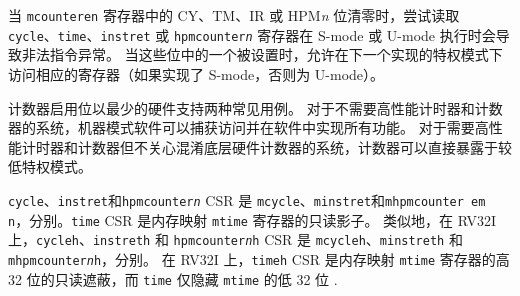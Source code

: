 当 {\tt mcounteren} 寄存器中的 CY、TM、IR 或 HPM{\em n} 位清零时，尝试读取 {\tt cycle}、{\tt time}、{\tt instret} 或 {\tt hpmcounter{\em n}} 寄存器在 S-mode 或 U-mode 执行时会导致非法指令异常。 当这些位中的一个被设置时，允许在下一个实现的特权模式下访问相应的寄存器（如果实现了 S-mode，否则为 U-mode）。

\iffalse
\begin{commentary}
The counter-enable bits support two common use cases with minimal hardware.
For systems that do not need high-performance timers and counters,
machine-mode software can trap accesses and implement all features in
software.  For systems that need high-performance timers and counters
but are not concerned with obfuscating the underlying hardware
counters, the counters can be directly exposed to lower privilege modes.
\end{commentary}
\fi

\begin{commentary}
计数器启用位以最少的硬件支持两种常见用例。 对于不需要高性能计时器和计数器的系统，机器模式软件可以捕获访问并在软件中实现所有功能。 对于需要高性能计时器和计数器但不关心混淆底层硬件计数器的系统，计数器可以直接暴露于较低特权模式。
\end{commentary}

\iffalse
The {\tt cycle}, {\tt instret}, and {\tt hpmcounter{\em n}} CSRs are
read-only shadows of {\tt mcycle}, {\tt minstret}, and {\tt mhpmcounter{\em
n}}, respectively.  The {\tt time} CSR is a read-only shadow of the
memory-mapped {\tt mtime} register.  Analogously, on RV32I the {\tt cycleh},
{\tt instreth} and {\tt hpmcounter{\em n}h} CSRs are read-only shadows of
{\tt mcycleh}, {\tt minstreth} and {\tt mhpmcounter{\em n}h}, respectively.
On RV32I the {\tt timeh} CSR is a read-only shadow of the upper 32 bits of
the memory-mapped {\tt mtime} register, while {\tt time} shadows only the
lower 32 bits of {\tt mtime}.
\fi

{\tt cycle}、{\tt instret}和{\tt hpmcounter{\em n}} CSR 是 {\tt mcycle}、{\tt minstret}和{\tt mhpmcounter{\ em n}}，分别。{\tt time} CSR 是内存映射 {\tt mtime} 寄存器的只读影子。 类似地，在 RV32I 上，{\tt cycleh}、{\tt instreth} 和 {\tt hpmcounter{\em n}h} CSR 是 {\tt mcycleh}、{\tt minstreth} 和 {\tt mhpmcounter{\em n}h}，分别。 在 RV32I 上，{\tt timeh} CSR 是内存映射 {\tt mtime} 寄存器的高 32 位的只读遮蔽，而 {\tt time} 仅隐藏 {\tt mtime} 的低 32 位 .

\iffalse
\begin{commentary}
Implementations can convert reads of the {\tt time} and {\tt timeh} CSRs
into loads to the memory-mapped {\tt mtime} register, or emulate this
functionality in M-mode software.
\end{commentary}
\fi


